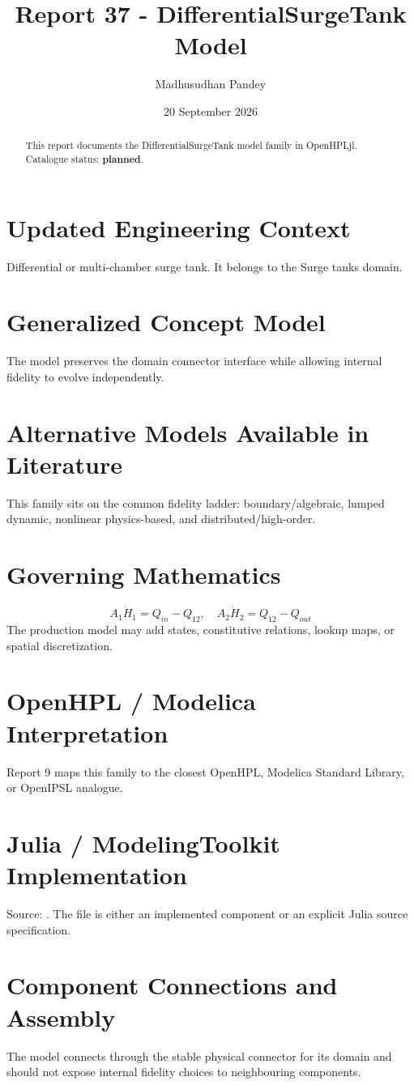 \documentclass[10pt,a4paper]{article}
\title{Report 37 - DifferentialSurgeTank Model}
\author{Madhusudhan Pandey}
\date{20 September 2026}
\begin{document}
\maketitle
\begin{abstract}This report documents the DifferentialSurgeTank model family in OpenHPLjl. Catalogue status: \textbf{planned}.\end{abstract}
\section{Updated Engineering Context}Differential or multi-chamber surge tank. It belongs to the Surge tanks domain.
\section{Generalized Concept Model}The model preserves the domain connector interface while allowing internal fidelity to evolve independently.
\section{Alternative Models Available in Literature}This family sits on the common fidelity ladder: boundary/algebraic, lumped dynamic, nonlinear physics-based, and distributed/high-order.
\section{Governing Mathematics}\[A_1\dot H_1=Q_{in}-Q_{12},\quad A_2\dot H_2=Q_{12}-Q_{out}\]The production model may add states, constitutive relations, lookup maps, or spatial discretization.
\section{OpenHPL / Modelica Interpretation}Report 9 maps this family to the closest OpenHPL, Modelica Standard Library, or OpenIPSL analogue.
\section{Julia / ModelingToolkit Implementation}Source: \texttt{}. The file is either an implemented component or an explicit Julia source specification.
\section{Component Connections and Assembly}The model connects through the stable physical connector for its domain and should not expose internal fidelity choices to neighbouring components.
\end{document}
